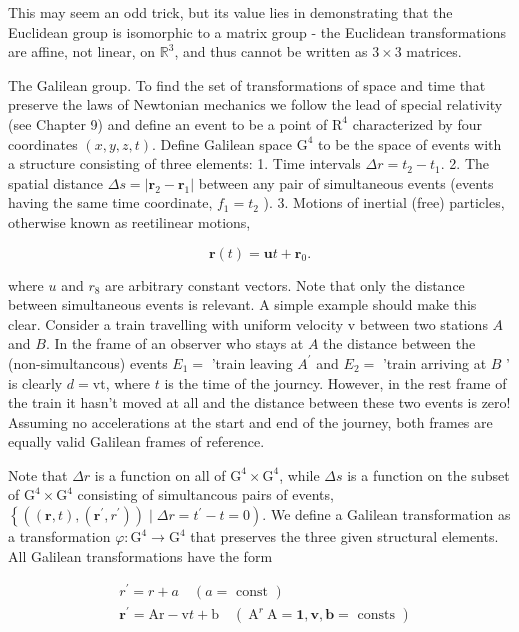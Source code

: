 This may seem an odd trick, but its value lies in demonstrating that the Euclidean group is isomorphic to a matrix group - the Euclidean transformations are affine, not linear, on $\mathbb{R}^3$, and thus cannot be written as $3 \times 3$ matrices.
\begin{eg}
    The Galilean group. To find the set of transformations of space and time that preserve the laws of Newtonian mechanics we follow the lead of special relativity (see Chapter 9) and define an event to be a point of $\mathrm{R}^4$ characterized by four coordinates $(x, y, z, t)$. Define Galilean space $\mathrm{G}^4$ to be the space of events with a structure consisting of three elements:
1. Time intervals $\Delta r=t_2-t_1$.
2. The spatial distance $\Delta s=\left|\mathbf{r}_2-\mathbf{r}_1\right|$ between any pair of simultaneous events (events having the same time coordinate, $f_1=t_2$ ).
3. Motions of inertial (free) particles, otherwise known as reetilinear motions,

$$
\mathbf{r}(t)=\mathbf{u} t+\mathbf{r}_0 .
$$

where $u$ and $r_8$ are arbitrary constant vectors.
Note that only the distance between simultaneous events is relevant. A simple example should make this clear. Consider a train travelling with uniform velocity v between two stations $A$ and $B$. In the frame of an observer who stays at $A$ the distance between the (non-simultancous) events $E_1=$ 'train leaving $A^{\prime}$ and $E_2=$ 'train arriving at $B$ ' is clearly $d=\mathrm{vt}$, where $t$ is the time of the journcy. However, in the rest frame of the train it hasn't moved at all and the distance between these two events is zero! Assuming no accelerations at the start and end of the journey, both frames are equally valid Galilean frames of reference.
\end{eg}

Note that $\Delta r$ is a function on all of $\mathrm{G}^4 \times \mathrm{G}^4$, while $\Delta s$ is a function on the subset of $\mathrm{G}^4 \times \mathrm{G}^4$ consisting of simultancous pairs of events, $\left\{\left((\mathbf{r}, t),\left(\mathbf{r}^{\prime}, r^{\prime}\right)\right) \mid \Delta r=t^{\prime}-t=0\right)$. We define a Galilean transformation as a transformation $\varphi: \mathrm{G}^4 \rightarrow \mathrm{G}^4$ that preserves the three given structural elements. All Galilean transformations have the form

$$
\begin{aligned}
& r^{\prime}=r+a \quad(a=\text { const }) \\
& \mathbf{r}^{\prime}=\mathrm{Ar}-\mathrm{v} t+\mathrm{b} \quad\left(\mathrm{~A}^r \mathrm{~A}=\mathbf{1}, \mathbf{v}, \mathbf{b}=\text { consts }\right)
\end{aligned}
$$


